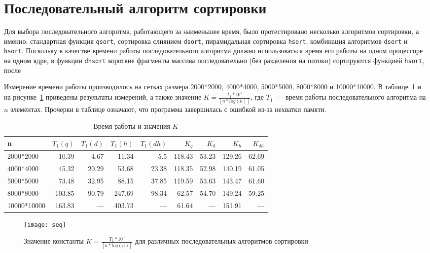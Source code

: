 \documentclass[oneside,final,14pt]{extreport}
\begin{document}
\section*{Последовательный алгоритм сортировки}
\label{seq_alg}
Для выбора последовательного алгоритма, работающего за наименьшее время,
было протестировано несколько алгоритмов сортировки, а именно:
стандартная функция \texttt{qsort}, сортировка слиянием \texttt{dsort},
пирамидальная сортировка \texttt{hsort}, комбинация алгоритмов \texttt{dsort}
и \texttt{hsort}. Поскольку в качестве времени работы последовательного
алгоритма должно использоваться время его работы на одном процессоре на одном ядре,
в функции \texttt{dhsort} короткие фрагменты массива последовательно
(без разделения на потоки) сортируются функцией \texttt{hsort}, после

Измерение времени работы производилось на сетках размера 2000*2000,
4000*4000, 5000*5000, 8000*8000 и 10000*10000. В таблице~\ref{seq_time_tab}
и на рисунке~\ref{seq_fig} приведены результаты
измерений, а также значение $K = \frac{T_1 * 10^9}{[ n * log(n)]}$, где
$T_1$~--- время работы последовательного алгоритма на $n$ элементах.
Прочерки в таблице означают, что программа завершилась с ошибкой из-за
нехватки памяти.

\begin{table}[hp]
\centering
\begin{tabular}{|l|r|r|r|r|r|r|r|r|}\hline
    n       & $T_1(q)$ & $T_1(d)$ & $T_1(h)$ & $T_1(dh)$ & $K_q$ & $K_d$ & $K_h$ & $K_{dh}$  \\ \hline
2000*2000   & 10.39    &  4.67    & 11.34    & 5.5       & 118.43& 53.23 & 129.26& 62.69   \\ \hline
4000*4000   & 45.32    &  20.29   & 53.68    & 23.38     & 118.35& 52.98 & 140.19& 61.05   \\ \hline
5000*5000   & 73.48    &  32.95   & 88.15    & 37.85     & 119.59& 53.63 & 143.47& 61.60   \\ \hline
8000*8000   & 103.85   &  90.79   & 247.69   & 98.34     & 62.57 & 54.70 & 149.24& 59.25   \\ \hline
10000*10000 & 163.83   &  ---     & 403.73   & ---       & 61.64 & ---   & 151.91& ---     \\ \hline
\end{tabular}
\caption{Время работы и значения $K$}
\label{seq_time_tab}
\end{table}

\begin{figure}[h]
    \centering
    \texttt{[image: seq]}
    \caption{Значение константы $K = \frac{T_1 * 10^9}{[ n * log(n)]}$ для различных последовательных алгоритмов сортировки}
    \label{seq_fig}
\end{figure}
\end{document}

